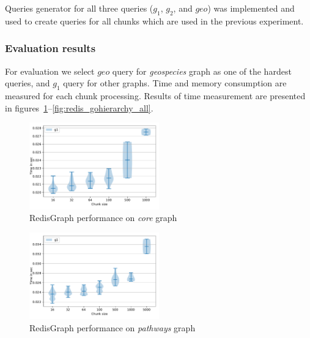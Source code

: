 \begin{algorithm}
\end{algorithm}

Queries generator for all three queries ($g_1$, $g_2$, and $geo$) was implemented and used to create queries for all chunks which are used in the previous experiment. 


\subsubsection{Evaluation results}

For evaluation we select $geo$ query for \textit{geospecies} graph as one of the hardest queries, and $g_1$ query for other graphs.
Time and memory consumption are measured for each chunk processing.
Results of time measurement are presented in figures~\ref{fig:redis_core_all}--\ref{fig:redis_gohierarchy_all}.

\begin{figure}[h]
\centering
\includegraphics[width=0.5\textwidth]{data/raw_redis/core.pdf}
\caption{RedisGraph performance on \textit{core} graph}
\label{fig:redis_core_all}
\end{figure}


\begin{figure}[h]
\centering
\includegraphics[width=0.5\textwidth]{data/raw_redis/pathways.pdf}
\caption{RedisGraph performance on \textit{pathways} graph}
\label{fig:redis_pathways_all}
\end{figure}

